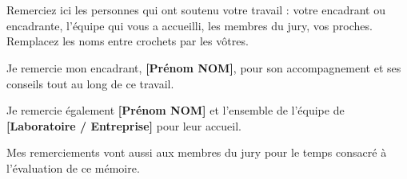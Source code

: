 \chapter*{\acknowledgementsname}
\thispagestyle{plain}

Remerciez ici les personnes qui ont soutenu votre travail : votre encadrant
ou encadrante, l'équipe qui vous a accueilli, les membres du jury, vos
proches. Remplacez les noms entre crochets par les vôtres.

Je remercie mon encadrant, \textbf{[Prénom NOM]}, pour son accompagnement et
ses conseils tout au long de ce travail.

Je remercie également \textbf{[Prénom NOM]} et l'ensemble de l'équipe de
\textbf{[Laboratoire / Entreprise]} pour leur accueil.

Mes remerciements vont aussi aux membres du jury pour le temps consacré à
l'évaluation de ce mémoire.

\vspace{1em}
\noindent\hfill\emph{\Author}

\newpage

